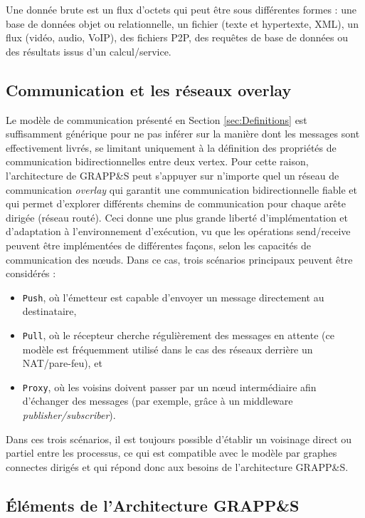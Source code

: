 \begin{definition}Une donnée  brute  est  un flux  d'octets qui peut être  sous  différentes formes : une base de données objet ou  relationnelle, un fichier (texte et hypertexte, XML), un flux (vidéo, audio, VoIP), des fichiers P2P, des  requêtes  de  base  de données ou des résultats issus d'un calcul/service.\end{definition}

\subsection{Communication et les réseaux overlay}
Le modèle de communication présenté en Section \ref{sec:Definitions} est suffisamment générique pour ne pas inférer sur la manière dont les messages sont effectivement livrés, se limitant uniquement à la définition des propriétés de communication bidirectionnelles entre deux vertex. Pour cette raison, l'architecture de GRAPP\&S peut s'appuyer sur n'importe quel un réseau de communication \textit{overlay} qui garantit une communication bidirectionnelle fiable et qui permet d'explorer différents chemins de communication pour chaque arête dirigée (réseau routé). Ceci donne une plus grande liberté d'implémentation et d'adaptation à l'environnement d'exécution, vu que les opérations send/receive peuvent être implémentées de différentes façons, selon les capacités de communication des n{\oe}uds. Dans ce cas, trois scénarios principaux peuvent être considérés : 
\begin{itemize}
	\item \texttt{Push}, où l'émetteur est capable d'envoyer un message directement au destinataire, 
	\item\texttt{Pull}, où le récepteur cherche régulièrement des messages en attente (ce modèle est fréquemment utilisé dans le cas des réseaux derrière un NAT/pare-feu), et 
	\item\texttt{Proxy}, où les voisins doivent passer par un n{\oe}ud intermédiaire afin d'échanger des messages (par exemple, grâce à un middleware \textit{publisher/subscriber}). 
\end{itemize}
Dans ces trois scénarios, il est toujours possible d'établir un voisinage direct ou partiel entre les processus, ce qui est compatible avec le modèle par graphes connectes dirigés et qui répond donc aux besoins de l'architecture GRAPP\&S. 


\subsection{Éléments de l'Architecture GRAPP\&S}

